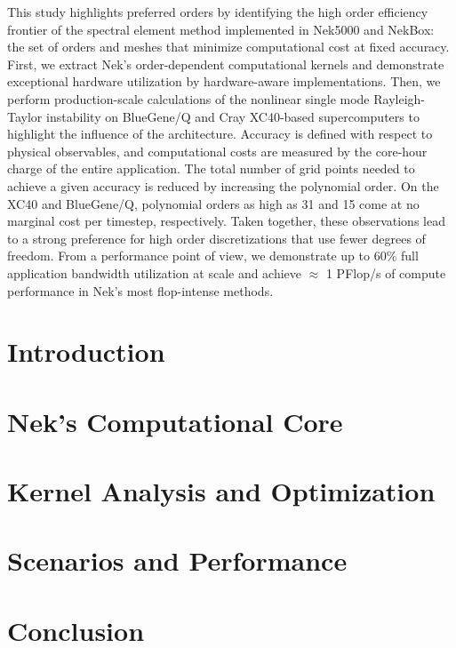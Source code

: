 This study highlights preferred orders by identifying the high order efficiency frontier of the spectral element method implemented in Nek5000 and NekBox: the set of orders and meshes that minimize computational cost at fixed accuracy.
First, we extract Nek's order-dependent computational kernels and demonstrate exceptional hardware utilization by hardware-aware implementations.
Then, we perform production-scale calculations of the nonlinear single mode Rayleigh-Taylor instability on BlueGene/Q and Cray XC40-based supercomputers to highlight the influence of the architecture.
Accuracy is defined with respect to physical observables, and computational costs are measured by the core-hour charge of the entire application.
The total number of grid points needed to achieve a given accuracy is reduced by increasing the polynomial order.
On the XC40 and BlueGene/Q, polynomial orders as high as 31 and 15 come at no marginal cost per timestep, respectively.
Taken together, these observations lead to a strong preference for high order discretizations that use fewer degrees of freedom.
From a performance point of view, we demonstrate up to 60\% full application bandwidth utilization at scale and achieve $\approx$ 1 PFlop/s of compute performance in Nek's most flop-intense methods.

\section{Introduction}
\label{sec:introduction}


\section{Nek's Computational Core}
\label{sec:math}


\section{Kernel Analysis and Optimization}
\label{sec:implementation}


\section{Scenarios and Performance}
\label{sec:benchmarks}


\section{Conclusion}
\label{sec:conclusion}



